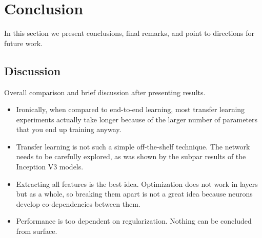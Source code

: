 \chapter{Conclusion}
\label{chapter:conclusion}

In this section we present conclusions, final remarks, and point to directions for future work.

\section{Discussion}

Overall comparison and brief discussion after presenting results.

\begin{itemize}
    \item Ironically, when compared to end-to-end learning, most transfer learning experiments actually take longer because of the larger number of parameters that you end up training anyway.
    \item Transfer learning is not such a simple off-the-shelf technique. The network needs to be carefully explored, as was shown by the subpar results of the Inception V3 models.
    \item Extracting all features is the best idea. Optimization does not work in layers but as a whole, so breaking them apart is not a great idea because neurons develop co-dependencies between them.
    \item Performance is too dependent on regularization. Nothing can be concluded from surface.
\end{itemize}
